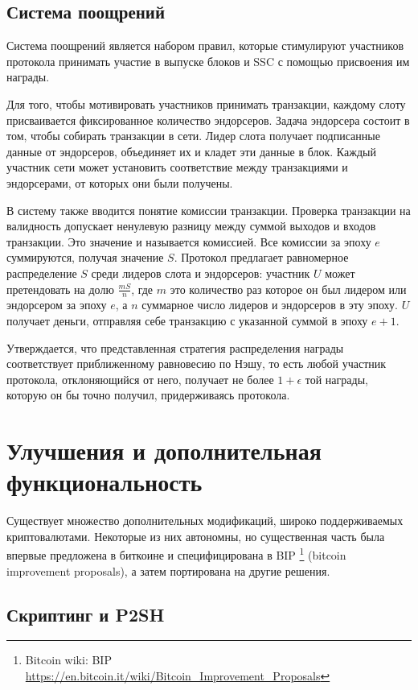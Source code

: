 \documentclass[specification,annotation]{itmo-student-thesis}
\begin{document}
\subsection{Система поощрений}

Система поощрений является набором правил, которые стимулируют
участников протокола принимать участие в выпуске блоков и SSC с
помощью присвоения им награды.

Для того, чтобы мотивировать участников принимать транзакции, каждому
слоту присваивается фиксированное количество эндорсеров. Задача
эндорсера состоит в том, чтобы собирать транзакции в сети. Лидер слота
получает подписанные данные от эндорсеров, объединяет их и кладет эти
данные в блок. Каждый участник сети может установить соответствие
между транзакциями и эндорсерами, от которых они были получены.

В систему также вводится понятие комиссии транзакции. Проверка
транзакции на валидность допускает ненулевую разницу между суммой
выходов и входов транзакции. Это значение и называется комиссией. Все
комиссии за эпоху $e$ суммируются, получая значение $S$. Протокол
предлагает равномерное распределение $S$ среди лидеров слота и
эндорсеров: участник $U$ может претендовать на долю $\frac{m S}{n}$, где
$m$ это количество раз которое он был лидером или эндорсером за эпоху
$e$, а $n$ суммарное число лидеров и эндорсеров в эту эпоху. $U$
получает деньги, отправляя себе транзакцию с указанной суммой в эпоху
$e+1$.

Утверждается, что представленная стратегия распределения награды
соответствует приближенному равновесию по Нэшу, то есть любой участник
протокола, отклоняющийся от него, получает не более $1 + \epsilon$ той
награды, которую он бы точно получил, придерживаясь протокола.

\section{Улучшения и дополнительная функциональность}

Существует множество дополнительных модификаций, широко поддерживаемых
криптовалютами. Некоторые из них автономны, но существенная часть была
впервые предложена в биткоине и специфицирована в
BIP \footnote{Bitcoin wiki: BIP
\url{https://en.bitcoin.it/wiki/Bitcoin_Improvement_Proposals}}
(bitcoin improvement proposals), а затем портирована на другие
решения.

\subsection{Скриптинг и P2SH}
\end{document}
